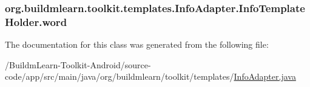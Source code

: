 \hypertarget{classorg_1_1buildmlearn_1_1toolkit_1_1templates_1_1InfoAdapter_1_1InfoTemplateHolder_a0391d141913c5ab231c1b22cc0c32a55}{
\subsubsection[{word}]{ org.\-buildmlearn.\-toolkit.\-templates.\-Info\-Adapter.\-Info\-Template\-Holder.\-word}}\label{classorg_1_1buildmlearn_1_1toolkit_1_1templates_1_1InfoAdapter_1_1InfoTemplateHolder_a0391d141913c5ab231c1b22cc0c32a55}


The documentation for this class was generated from the following file\-:\begin{DoxyCompactItemize}
\item 
/\-Buildm\-Learn-\/\-Toolkit-\/\-Android/source-\/code/app/src/main/java/org/buildmlearn/toolkit/templates/\hyperlink{InfoAdapter_8java}{Info\-Adapter.\-java}\end{DoxyCompactItemize}
